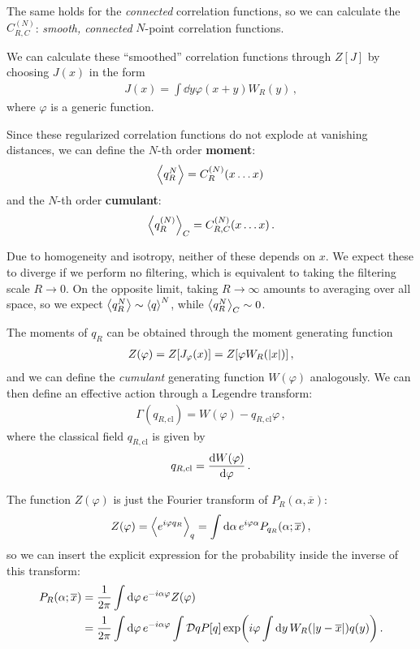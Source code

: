\documentclass[main.tex]{subfiles}
\begin{document}
The same holds for the \emph{connected} correlation functions, so we can calculate the \(C^{(N)}_{R, C}\): \emph{smooth, connected} \(N\)-point correlation functions. 

We can calculate these ``smoothed'' correlation functions through \(Z[J]\) by choosing \(J(x)\) in the form 
%
\begin{align}
J(x) =\int \dd{y} \varphi (x+y) W_R (y)
\,,
\end{align}
%
where \(\varphi \) is a generic function.

Since these regularized correlation functions do not explode at vanishing distances, we can define the \(N\)-th order \textbf{moment}:
%
\begin{align}
\expval{q_R^{N}} = C^{(N)}_R (x \dots x) 
\,
\end{align}
%
and the \(N\)-th order \textbf{cumulant}: 
%
\begin{align}
\expval{q_R^{(N)}}_C = C^{(N)}_{R, C} (x \dots x)
\,.
\end{align}

Due to homogeneity and isotropy, neither of these depends on \(x\). 
We expect these to diverge if we perform no filtering, which is equivalent to taking the filtering scale \(R \to 0\).
On the opposite limit, taking \(R \to \infty \) amounts to averaging over all space, so we expect \(\expval{q_R^{N}} \sim \expval{q}^{N}\), while \(\expval{q_R^{N}}_C \sim 0\). 

The moments of \(q_R\) can be obtained through the moment generating function 
%
\begin{align}
Z(\varphi ) = Z[J_\varphi (x) ] = Z[\varphi W_R (\abs{x})]
\,,
\end{align}
%
and we can define the \emph{cumulant} generating function \(W(\varphi )\) analogously. 
We can then define an effective action through a Legendre transform:
%
\begin{align}
\Gamma (q_{R, \text{cl}}) = W(\varphi ) - q_{R, \text{cl}} \varphi 
\,,
\end{align}
%
where the classical field \(q_{R, \text{cl}}\) is given by 
%
\begin{align}
q_{R, \text{cl}} = \dv{W(\varphi )}{\varphi }
\,.
\end{align}

The function \(Z(\varphi )\) is just the Fourier transform of \(P_R(\alpha , \overline{x})\): 
%
\begin{align}
Z(\varphi ) = \expval{e^{i \varphi q_R}}_q 
= \int  \dd{\alpha } e^{i \varphi \alpha } P_{q_R} (\alpha ; \overline{x}) 
\,,
\end{align}
%
so we can insert the explicit expression for the probability inside the inverse of this transform: 
%
\begin{align}
P_R(\alpha ; \overline{x}) &= \frac{1}{2 \pi } \int \dd{\varphi } e^{-i \alpha \varphi } Z(\varphi ) \\
&= \frac{1}{2 \pi } \int \dd{\varphi } e^{-i \alpha \varphi }
\int \mathcal{D}q P[q] \exp(i \varphi \int \dd{y} W_R (\abs{y - \overline{x}}) q(y) )
\,.
\end{align}
\end{document}
